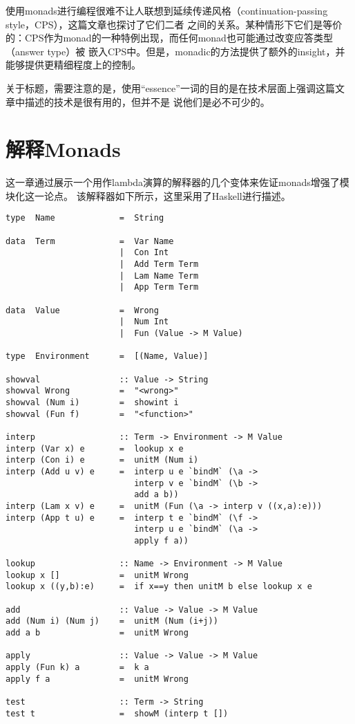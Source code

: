 \documentclass[12pt]{article}
\begin{document}
\indent{}使用monads进行编程很难不让人联想到延续传递风格（continuation-passing style，CPS），这篇文章也探讨了它们二者
之间的关系。某种情形下它们是等价的：CPS作为monad的一种特例出现，而任何monad也可能通过改变应答类型（answer type）被
嵌入CPS中。但是，monadic的方法提供了额外的insight，并能够提供更精细程度上的控制。

\indent{}关于标题，需要注意的是，使用“essence”一词的目的是在技术层面上强调这篇文章中描述的技术是很有用的，但并不是
说他们是必不可少的。
\vspace{-0.6em}
\section{解释Monads}\label{sec:interp_monad}
这一章通过展示一个用作lambda演算的解释器的几个变体来佐证monads增强了模块化这一论点。
该解释器如下所示，这里采用了Haskell进行描述。
\begin{verbatim}
type  Name             =  String

data  Term             =  Var Name
                       |  Con Int
                       |  Add Term Term
                       |  Lam Name Term
                       |  App Term Term

data  Value            =  Wrong
                       |  Num Int
                       |  Fun (Value -> M Value)

type  Environment      =  [(Name, Value)]

showval                :: Value -> String
showval Wrong          =  "<wrong>"
showval (Num i)        =  showint i
showval (Fun f)        =  "<function>"

interp                 :: Term -> Environment -> M Value
interp (Var x) e       =  lookup x e
interp (Con i) e       =  unitM (Num i)
interp (Add u v) e     =  interp u e `bindM` (\a ->
                          interp v e `bindM` (\b ->
                          add a b))
interp (Lam x v) e     =  unitM (Fun (\a -> interp v ((x,a):e)))
interp (App t u) e     =  interp t e `bindM` (\f ->
                          interp u e `bindM` (\a ->
                          apply f a))

lookup                 :: Name -> Environment -> M Value
lookup x []            =  unitM Wrong
lookup x ((y,b):e)     =  if x==y then unitM b else lookup x e

add                    :: Value -> Value -> M Value
add (Num i) (Num j)    =  unitM (Num (i+j))
add a b                =  unitM Wrong

apply                  :: Value -> Value -> M Value
apply (Fun k) a        =  k a
apply f a              =  unitM Wrong

test                   :: Term -> String
test t                 =  showM (interp t [])
\end{verbatim}
\end{document}
